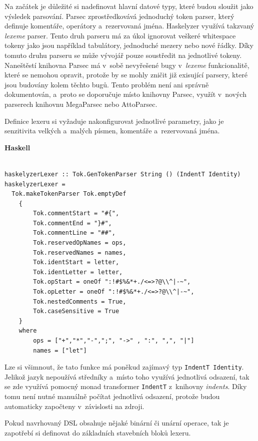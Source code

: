 \documentclass[male, czech]{kithesis}
\newcommand{\haskellInline}[1]{\colorbox{gray!10}{\texttt{#1}}}
\begin{document}
Na začátek je důležité si nadefinovat hlavní datové typy, 
které budou sloužit jako výsledek parsování.
Parsec zprostředkovává jednoduchý token parser, 
který definuje komentáře, 
operátory a~rezervovaná jména.
Haskelyzer využívá takzvaný \textit{lexeme} parser.
Tento druh parseru má za úkol ignorovat veškeré whitespace tokeny jako
jsou například tabulátory, 
jednoduché mezery nebo nové řádky.
Díky tomuto druhu parseru se může vývojář pouze soustředit na 
jednotlivé tokeny. 
Naneštěstí knihovna Parsec má v~sobě nevyřešené bugy v~\textit{lexeme} funkcionalitě, 
které se nemohou opravit, 
protože by se mohly zničit již exisující parsery,
které jsou budovány kolem těchto bugů.
Tento problém není ani správně dokumentován, 
a~proto se doporučuje místo knihovny Parsec, 
využít v~nových parserech knihovnu MegaParsec nebo AttoParsec. 

Definice lexeru si vyžaduje nakonfigurovat jednotlivé parametry,
jako je senzitivita velkých a~malých písmen, 
komentáře a~rezervovaná jména.

\textbf{Haskell}
\begin{verbatim}

haskelyzerLexer :: Tok.GenTokenParser String () (IndentT Identity)
haskelyzerLexer =
  Tok.makeTokenParser Tok.emptyDef 
    { 
        Tok.commentStart = "#{",
        Tok.commentEnd = "}#",
        Tok.commentLine = "##",
        Tok.reservedOpNames = ops,
        Tok.reservedNames = names,
        Tok.identStart = letter,
        Tok.identLetter = letter,
        Tok.opStart = oneOf ":!#$%&*+./<=>?@\\^|-~",
        Tok.opLetter = oneOf ":!#$%&*+./<=>?@\\^|-~",
        Tok.nestedComments = True,
        Tok.caseSensitive = True
    }
    where
        ops = ["+","*","-",";", "->" , ":", ",", "|"]
        names = ["let"]

\end{verbatim}

Lze si všimnout, 
že tato funkce má poněkud zajímavý typ \haskellInline{IndentT Identity}.
Jelikož jazyk nepoužívá středníky
a~místo toho využívá jednotlivá odsazení, 
tak se zde využívá pomocný monad transformer \haskellInline{IndentT} z~knihovny \textit{indents}. 
Díky tomu není nutné manuálně počítat jednotlivá odsazení, 
protože budou automaticky započteny v~závislosti na zdroji.

Pokud navrhovaný DSL obsahuje nějaké binární či unární operace, 
tak je zapotřebí si definovat do základních stavebních bloků lexeru.
\end{document}
